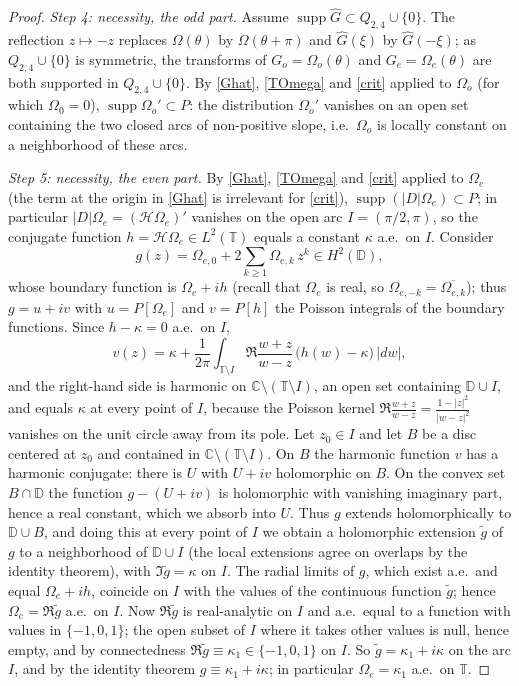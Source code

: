 \documentclass{article}
\newcommand{\tmop}[1]{\ensuremath{\operatorname{#1}}}
\def\C{{\mathbb C}}
\def\T{{\mathbb T}}
\begin{document}
\begin{proof}
		\emph{Step 4: necessity, the odd part.} Assume $\tmop{supp}\hat G\subset Q_{2,4}\cup\{0\}$. The reflection $z\mapsto-z$ replaces $\Omega(\theta)$ by $\Omega(\theta+\pi)$ and $\hat G(\xi)$ by $\hat G(-\xi)$; as $Q_{2,4}\cup\{0\}$ is symmetric, the transforms of $G_o=\Omega_o(\theta)$ and $G_e=\Omega_e(\theta)$ are both supported in $Q_{2,4}\cup\{0\}$. By \eqref{Ghat}, \eqref{TOmega} and \eqref{crit} applied to $\Omega_o$ (for which $\Omega_0=0$), $\tmop{supp}\Omega_o'\subset P$: the distribution $\Omega_o'$ vanishes on an open set containing the two closed arcs of non-positive slope, i.e.\ $\Omega_o$ is locally constant on a neighborhood of these arcs.

		\emph{Step 5: necessity, the even part.} By \eqref{Ghat}, \eqref{TOmega} and \eqref{crit} applied to $\Omega_e$ (the term at the origin in \eqref{Ghat} is irrelevant for \eqref{crit}), $\tmop{supp}(|D|\Omega_e)\subset P$; in particular $|D|\Omega_e=(\mathcal H\Omega_e)'$ vanishes on the open arc $I=(\pi/2,\pi)$, so the conjugate function $h=\mathcal H\Omega_e\in L^2(\T)$ equals a constant $\kappa$ a.e.\ on $I$. Consider
		$$g(z)=\Omega_{e,0}+2\sum_{k\geq1}\Omega_{e,k}\,z^k\in H^2(\mathbb D),$$
		whose boundary function is $\Omega_e+ih$ (recall that $\Omega_e$ is real, so $\Omega_{e,-k}=\overline{\Omega_{e,k}}$); thus $g=u+iv$ with $u=P[\Omega_e]$ and $v=P[h]$ the Poisson integrals of the boundary functions. Since $h-\kappa=0$ a.e.\ on $I$,
		$$v(z)=\kappa+\frac1{2\pi}\int_{\T\setminus I}\Re\frac{w+z}{w-z}\,\big(h(w)-\kappa\big)\,|dw| ,$$
		and the right-hand side is harmonic on $\C\setminus(\T\setminus I)$, an open set containing $\mathbb D\cup I$, and equals $\kappa$ at every point of $I$, because the Poisson kernel $\Re\frac{w+z}{w-z}=\frac{1-|z|^2}{|w-z|^2}$ vanishes on the unit circle away from its pole. Let $z_0\in I$ and let $B$ be a disc centered at $z_0$ and contained in $\C\setminus(\T\setminus I)$. On $B$ the harmonic function $v$ has a harmonic conjugate: there is $U$ with $U+iv$ holomorphic on $B$. On the convex set $B\cap\mathbb D$ the function $g-(U+iv)$ is holomorphic with vanishing imaginary part, hence a real constant, which we absorb into $U$. Thus $g$ extends holomorphically to $\mathbb D\cup B$, and doing this at every point of $I$ we obtain a holomorphic extension $\tilde g$ of $g$ to a neighborhood of $\mathbb D\cup I$ (the local extensions agree on overlaps by the identity theorem), with $\Im\tilde g=\kappa$ on $I$. The radial limits of $g$, which exist a.e.\ and equal $\Omega_e+ih$, coincide on $I$ with the values of the continuous function $\tilde g$; hence $\Omega_e=\Re\tilde g$ a.e.\ on $I$. Now $\Re\tilde g$ is real-analytic on $I$ and a.e.\ equal to a function with values in $\{-1,0,1\}$; the open subset of $I$ where it takes other values is null, hence empty, and by connectedness $\Re\tilde g\equiv\kappa_1\in\{-1,0,1\}$ on $I$. So $\tilde g=\kappa_1+i\kappa$ on the arc $I$, and by the identity theorem $g\equiv\kappa_1+i\kappa$; in particular $\Omega_e=\kappa_1$ a.e.\ on $\T$.


\end{proof}
\end{document}
